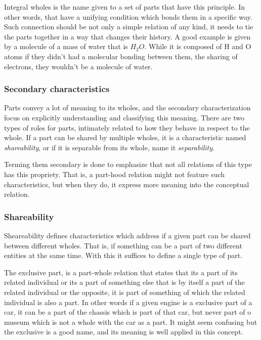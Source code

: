 Integral wholes is the name given to a set of parts that have this principle. In other words, that have a unifying condition which bonds them in a specific way. Such connection should be not only a simple relation of any kind, it needs to tie the parts together in a way that changes their history. A good example is given by a molecule of a mass of water that is $H_2O$. While it is composed of H and O atoms if they didn't had a molecular bonding between them, the sharing of electrons, they wouldn't be a molecule of water.

\subsubsection{Secondary characteristics}

Parts convey a lot of meaning to its wholes, and the secondary characterization focus on explicitly understanding and classifying this meaning. There are two types of roles for parts, intimately related to how they behave in respect to the whole. If a part can be shared by multiple wholes, it is a characteristic named \textit{shareability}, or if it is separable from its whole, name it \textit{separability}.

Terming them secondary is done to emphasize that not all relations of this type has this propriety. That is, a part-hood relation might not feature such characteristics, but when they do, it express more meaning into the conceptual relation.

\subsubsection{Shareability}

Sheareability defines characteristics which address if a given part can be shared between different wholes. That is, if something can be a part of two different entities at the same time. With this it suffices to define a single type of part. 

The exclusive part, is a part-whole relation that states that its a part of its related individual or its a part of something else that is by itself a part of the related individual or the opposite, it is part of something of which the related individual is also a part. In other words if a given engine is a exclusive part of a car, it can be a part of the chassis which is part of that car, but never part of o museum which is not a whole with the car as a part. It might seem confusing but the exclusive is a good name, and its meaning is well applied in this concept.


